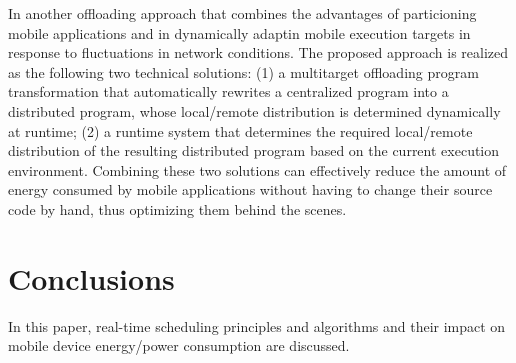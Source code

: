 \documentclass[10pt,article]{IEEEtran}
\begin{document}
In \cite{kwon-tilevich} another offloading approach that combines the advantages of particioning mobile applications and in dynamically adaptin mobile execution targets in response to fluctuations in network conditions. The proposed approach is realized as the following two technical solutions: (1) a multitarget offloading program transformation that automatically rewrites a centralized program into a distributed program, whose local/remote distribution is determined dynamically at runtime; (2) a runtime system that determines the required local/remote distribution of the resulting distributed program based on the current execution environment. Combining these two solutions can effectively reduce the amount of energy consumed by mobile applications without having to change their source code by hand, thus optimizing them behind the scenes.




%


\section{Conclusions}
In this paper, real-time scheduling principles and algorithms and their impact on mobile device energy/power consumption are discussed.


\IEEEdisplaynontitleabstractindextext


%
\IEEEpeerreviewmaketitle
\end{document}
